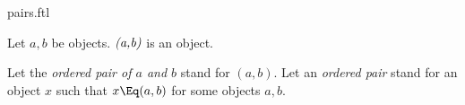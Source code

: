 \documentclass{stex}
\begin{document}
\begin{smodule}{pairs.ftl}



\begin{fakeforthel}
  \begin{signature}
    Let $a,b$ be objects.
    $\emph{(a,b)}$ is an object.
  \end{signature}
\end{fakeforthel}

\begin{forthel}
  \begin{convention}
    Let the \emph{ordered pair of $a$ and $b$} stand for $(a,b)$.
    Let an \emph{ordered pair} stand for an object $x$ such that $x \Eq (a,b)$ for some objects $a, b$.
  \end{convention}
\end{forthel}

\end{smodule}
\end{document}
